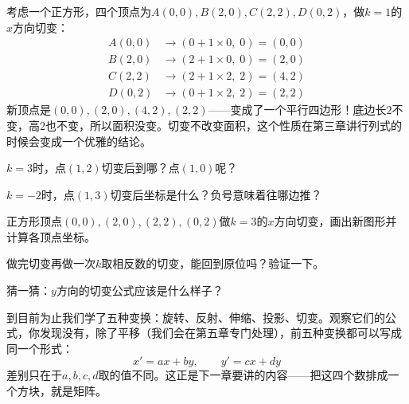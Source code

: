\documentclass[a4paper,12pt]{ctexart}
\begin{document}
考虑一个正方形，四个顶点为$A(0,0),B(2,0),C(2,2),D(0,2)$，做$k=1$的$x$方向切变：
\begin{align*}
A(0,0) &\to (0+1\times0,\;0) = (0,0)\\
B(2,0) &\to (2+1\times0,\;0) = (2,0)\\
C(2,2) &\to (2+1\times2,\;2) = (4,2)\\
D(0,2) &\to (0+1\times2,\;2) = (2,2)
\end{align*}
新顶点是$(0,0),(2,0),(4,2),(2,2)$——变成了一个平行四边形！底边长$2$不变，高$2$也不变，所以面积没变。切变不改变面积，这个性质在第三章讲行列式的时候会变成一个优雅的结论。

\begin{exercise}[切变练习]
\item $k=3$时，点$(1,2)$切变后到哪？点$(1,0)$呢？
\item $k=-2$时，点$(1,3)$切变后坐标是什么？负号意味着往哪边推？
\item 正方形顶点$(0,0),(2,0),(2,2),(0,2)$做$k=3$的$x$方向切变，画出新图形并计算各顶点坐标。
\item 做完切变再做一次$k$取相反数的切变，能回到原位吗？验证一下。
\item 猜一猜：$y$方向的切变公式应该是什么样子？
\end{exercise}



到目前为止我们学了五种变换：旋转、反射、伸缩、投影、切变。观察它们的公式，你发现没有，除了平移（我们会在第五章专门处理），前五种变换都可以写成同一个形式：
\[
x' = ax + by,\qquad y' = cx + dy
\]
差别只在于$a,b,c,d$取的值不同。这正是下一章要讲的内容——把这四个数排成一个方块，就是矩阵。
\end{document}
